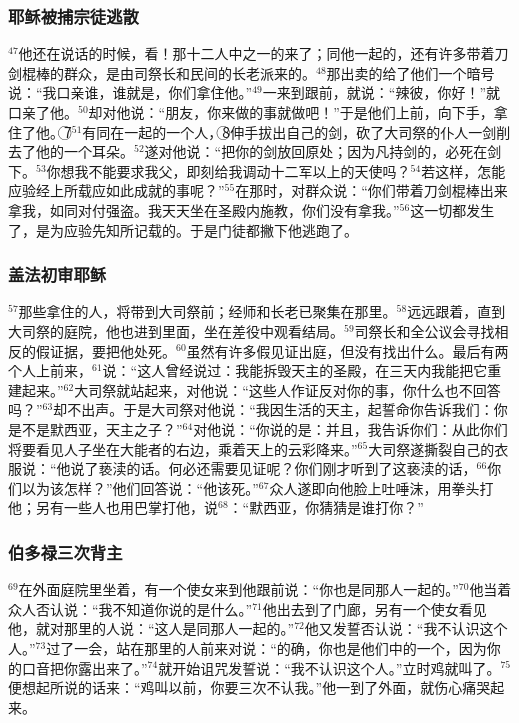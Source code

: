 \subsubsection{耶稣被捕宗徒逃散}
$^{47}$他还在说话的时候，看！那十二人中之一的\UL[犹达斯]来了；同他一起的，还有许多带着刀剑棍棒的群众，是由司祭长和民间的长老派来的。$^{48}$那出卖\UL[耶稣]的给了他们一个暗号说：“我口亲谁，谁就是，你们拿住他。”$^{49}$\UL[犹达斯]一来到\UL[耶稣]跟前，就说：“辣彼，你好！”就口亲了他。$^{50}$\UL[耶稣]却对他说：“朋友，你来做的事就做吧！”于是他们上前，向\UL[耶稣]下手，拿住了他。\textcircled{7}$^{51}$有同\UL[耶稣]在一起的一个人，\textcircled{8}伸手拔出自己的剑，砍了大司祭的仆人一剑削去了他的一个耳朵。$^{52}$\UL[耶稣]遂对他说：“把你的剑放回原处；因为凡持剑的，必死在剑下。$^{53}$你想我不能要求我父，即刻给我调动十二军以上的天使吗？$^{54}$若这样，怎能应验经上所载应如此成就的事呢？”$^{55}$在那时，\UL[耶稣]对群众说：“你们带着刀剑棍棒出来拿我，如同对付强盗。我天天坐在圣殿内施教，你们没有拿我。”$^{56}$这一切都发生了，是为应验先知所记载的。于是门徒都撇下他逃跑了。


\subsubsection{盖法初审耶稣}
$^{57}$那些拿住\UL[耶稣]的人，将\UL[耶稣]带到大司祭\UL[盖法]前；经师和长老已聚集在那里。$^{58}$\UL[伯多禄]远远跟着\UL[耶稣]，直到大司祭的庭院，他也进到里面，坐在差役中观看结局。$^{59}$司祭长和全公议会寻找相反\UL[耶稣]的假证据，要把他处死。$^{60}$虽然有许多假见证出庭，但没有找出什么。最后有两个人上前来，$^{61}$说：“这人曾经说过：我能拆毁天主的圣殿，在三天内我能把它重建起来。”$^{62}$大司祭就站起来，对他说：“这些人作证反对你的事，你什么也不回答吗？”$^{63}$\UL[耶稣]却不出声。于是大司祭对他说：“我因生活的天主，起誓命你告诉我们：你是不是默西亚，天主之子？”$^{64}$\UL[耶稣]对他说：“你说的是：并且，我告诉你们：从此你们将要看见人子坐在大能者的右边，乘着天上的云彩降来。”$^{65}$大司祭遂撕裂自己的衣服说：“他说了亵渎的话。何必还需要见证呢？你们刚才听到了这亵渎的话，$^{66}$你们以为该怎样？”他们回答说：“他该死。”$^{67}$众人遂即向他脸上吐唾沫，用拳头打他；另有一些人也用巴掌打他，说$^{68}$：“默西亚，你猜猜是谁打你？”


\subsubsection{伯多禄三次背主}
$^{69}$\UL[伯多禄]在外面庭院里坐着，有一个使女来到他跟前说：“你也是同那\UL[加里肋亚]人\UL[耶稣]一起的。”$^{70}$他当着众人否认说：“我不知道你说的是什么。”$^{71}$他出去到了门廊，另有一个使女看见他，就对那里的人说：“这人是同那\UL[纳匝肋]人\UL[耶稣]一起的。”$^{72}$他又发誓否认说：“我不认识这个人。”$^{73}$过了一会，站在那里的人前来对\UL[伯多禄]说：“的确，你也是他们中的一个，因为你的口音把你露出来了。”$^{74}$\UL[伯多禄]就开始诅咒发誓说：“我不认识这个人。”立时鸡就叫了。$^{75}$\UL[伯多禄]便想起\UL[耶稣]所说的话来：“鸡叫以前，你要三次不认我。”他一到了外面，就伤心痛哭起来。


